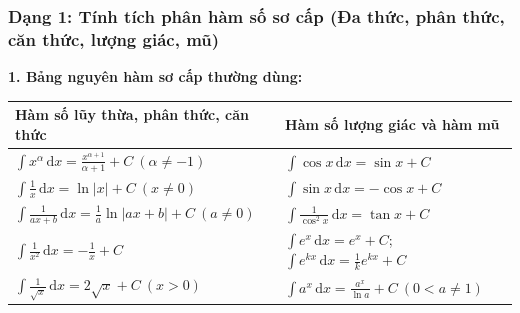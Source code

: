 \documentclass[12pt]{article}
\begin{document}
	\subsubsection{Dạng 1: Tính tích phân hàm số sơ cấp (Đa thức, phân thức, căn thức, lượng giác, mũ)}
	
	\noindent \textbf{1. Bảng nguyên hàm sơ cấp thường dùng:}
	\begin{center}
		\small
		\begin{tabular}{|l|l|}
			\hline
			\textbf{Hàm số lũy thừa, phân thức, căn thức} & \textbf{Hàm số lượng giác và hàm mũ} \\ \hline
			$\displaystyle \int x^\alpha\,\mathrm{d}x = \frac{x^{\alpha+1}}{\alpha+1} + C \ (\alpha \ne -1)$ & $\displaystyle \int \cos x\,\mathrm{d}x = \sin x + C$ \\
			$\displaystyle \int \frac{1}{x}\,\mathrm{d}x = \ln|x| + C \ (x \ne 0)$ & $\displaystyle \int \sin x\,\mathrm{d}x = -\cos x + C$ \\
			$\displaystyle \int \frac{1}{ax + b}\,\mathrm{d}x = \frac{1}{a} \ln|ax + b| + C \ (a \ne 0)$ & $\displaystyle \int \frac{1}{\cos^2 x}\,\mathrm{d}x = \tan x + C$ \\
			$\displaystyle \int \frac{1}{x^2}\,\mathrm{d}x = -\frac{1}{x} + C$ & $\displaystyle \int e^x\,\mathrm{d}x = e^x + C$; \ $\displaystyle \int e^{kx}\,\mathrm{d}x = \frac{1}{k} e^{kx} + C$ \\
			$\displaystyle \int \frac{1}{\sqrt{x}}\,\mathrm{d}x = 2\sqrt{x} + C \ (x > 0)$ & $\displaystyle \int a^x\,\mathrm{d}x = \frac{a^x}{\ln a} + C \ (0 < a \ne 1)$ \\ \hline
		\end{tabular}
	\end{center}
	
\end{document}
